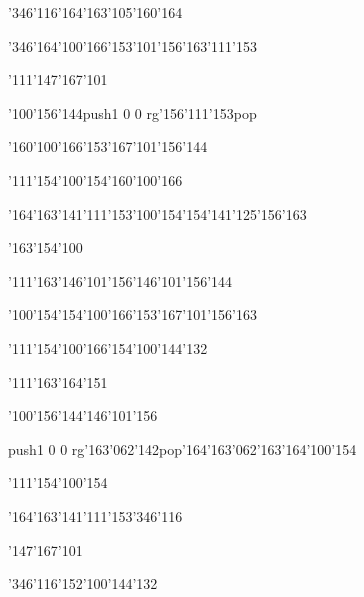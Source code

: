\null\vfill\ipa\centerline{\enskip\char'346\char'116\enskip\enskip\enskip\enskip\enskip\char'164\char'163\char'105\char'160\char'164}\medskip\centerline{\enskip\char'346\enskip\char'164\char'100\char'166\enskip\char'153\char'101\char'156\char'163\enskip\char'111\char'153}\medskip\centerline{\enskip\char'111\enskip\char'147\char'167\char'101\enskip\enskip\enskip\enskip\enskip\enskip}\medskip\centerline{\enskip\enskip\enskip\enskip\char'100\char'156\char'144\enskip\enskip\enskip\enskip\pdfcolorstack\match push{1 0 0 rg}\char'156\char'111\char'153\pdfcolorstack\match pop{}}\medskip\centerline{\enskip\char'160\char'100\char'166\enskip\enskip\enskip\enskip\enskip\enskip\enskip\char'153\char'167\char'101\char'156\char'144\enskip\enskip\enskip}\medskip\centerline{\enskip\char'111\enskip\enskip\enskip\enskip\enskip\char'154\char'100\char'154\enskip\char'160\char'100\char'166\enskip\enskip\enskip}\medskip\centerline{\enskip\char'164\char'163\char'141\char'111\char'153\enskip\char'100\char'154\enskip\char'154\char'141\char'125\char'156\char'163\enskip\enskip\enskip}\medskip\centerline{\enskip\enskip\enskip\char'163\char'154\char'100\enskip\enskip\enskip\enskip\enskip\enskip}\medskip\centerline{\enskip\char'111\char'163\enskip\enskip\enskip\enskip\char'146\char'101\char'156\enskip\char'146\char'101\char'156\char'144}\medskip\vfill\footline{\hfil\tt\folio\hfil}\eject
\null\vfill\ipa\centerline{\enskip\char'100\char'154\enskip\char'154\char'100\char'166\enskip\char'153\char'167\char'101\char'156\char'163}\medskip\centerline{\enskip\char'111\enskip\char'154\char'100\char'166\enskip\char'154\char'100\char'144\char'132\enskip\enskip\enskip}\medskip\centerline{\enskip\char'111\enskip\char'163\char'164\char'151\enskip\enskip\enskip\enskip\enskip\enskip}\medskip\centerline{\enskip\enskip\enskip\enskip\char'100\char'156\char'144\enskip\enskip\enskip\enskip\char'146\char'101\char'156}\medskip\centerline{\enskip\pdfcolorstack\match push{1 0 0 rg}\char'163\char'062\char'142\pdfcolorstack\match pop{}\enskip\enskip\enskip\enskip\enskip\enskip\enskip\char'164\char'163\char'062\char'163\char'164\enskip\char'100\char'154}\medskip\centerline{\enskip\char'111\enskip\enskip\enskip\enskip\enskip\enskip\enskip\enskip\enskip\char'154\char'100\char'154\enskip\enskip\enskip}\medskip\centerline{\enskip\char'164\char'163\char'141\char'111\char'153\enskip\enskip\enskip\enskip\enskip\enskip\enskip\enskip\enskip\enskip\char'346\char'116}\medskip\centerline{\enskip\enskip\enskip\char'147\char'167\char'101\enskip\enskip\enskip\enskip\enskip\enskip}\medskip\centerline{\enskip\char'346\char'116\enskip\enskip\enskip\enskip\enskip\enskip\enskip\enskip\char'152\char'100\char'144\char'132}\medskip\vfill\footline{\hfil\tt\folio\hfil}\eject
